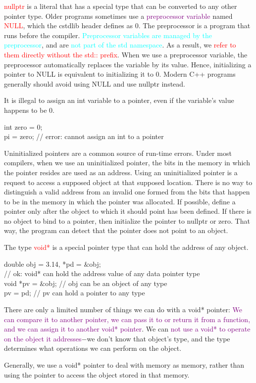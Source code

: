 \documentclass[12pt,a4paper]{article}
\begin{document}
\textcolor{red}{nullptr} is a literal that has a special type that can be converted to any other pointer type. Older programs sometimes use a \textcolor{purple}{preprocessor variable} named \textcolor{red}{NULL}, which the cstdlib header defines as 0. The preprocessor is a program that runs before the compiler. \textcolor{cyan}{Preprocessor variables are managed by the preprocessor}, and are \textcolor{cyan}{not part of the std namespace}. As a result, we \textcolor{red}{refer to them directly without the std:: prefix}. When we use a preprocessor variable, the preprocessor automatically replaces the variable by its value. Hence, initializing a pointer to NULL is equivalent to initializing it to 0. Modern C++ programs generally should avoid using NULL and use nullptr instead.

It is illegal to assign an int variable to a pointer, even if the variable’s value happens to be 0.

int zero = 0; \\
pi = zero; // error: cannot assign an int to a pointer
 
Uninitialized pointers are a common source of run-time errors. Under most compilers, when we use an uninitialized pointer, the bits in the memory in which the pointer resides are used as an address. Using an uninitialized pointer is a request to access a supposed object at that supposed location. There is no way to distinguish a valid address from an invalid one formed from the bits that happen to be in the memory in which the pointer was allocated. If possible, define a pointer only after the object to which it should point has been defined. If there is no object to bind to a pointer, then initialize the pointer to nullptr or zero. That way, the program can detect that the pointer does not point to an object.





The type \textcolor{red}{void*} is a special pointer type that can hold the address of any object. 

double obj = 3.14, *pd = $\&$obj; \\
// ok: void* can hold the address value of any data pointer type \\
void *pv = $\&$obj; // obj can be an object of any type \\
pv = pd; // pv can hold a pointer to any type

There are only a limited number of things we can do with a void* pointer: \textcolor{purple}{We can compare it to another pointer, we can pass it to or return it from a function, and we can assign it to another void* pointer}. We can \textcolor{purple}{not use a void* to operate on the object it addresses}$-$we don’t know that object’s type, and the type determines what operations we can perform on the object.

Generally, we use a void* pointer to deal with memory as memory, rather than using the pointer to access the object stored in that memory. 
\end{document}
